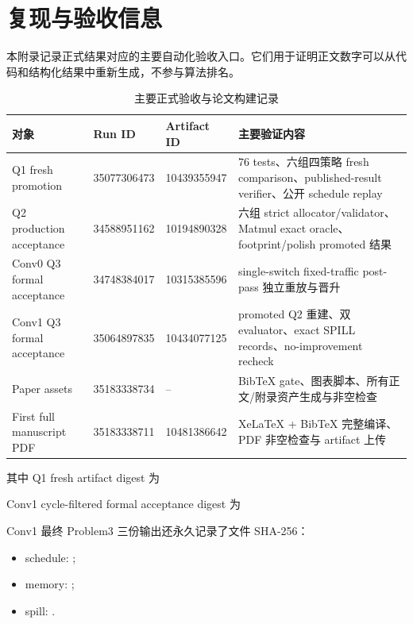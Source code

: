 \section{复现与验收信息}

本附录记录正式结果对应的主要自动化验收入口。它们用于证明正文数字可以从代码和结构化结果中重新生成，不参与算法排名。

\begin{table}[H]
\centering
\caption{主要正式验收与论文构建记录}
\label{tab:app-provenance}
\begin{tabular}{p{3.5cm}p{2.3cm}p{2.5cm}p{5.0cm}}
\toprule
对象 & Run ID & Artifact ID & 主要验证内容 \\
\midrule
Q1 fresh promotion & 35077306473 & 10439355947 & 76 tests、六组四策略 fresh comparison、published-result verifier、公开 schedule replay \\
Q2 production acceptance & 34588951162 & 10194890328 & 六组 strict allocator/validator、Matmul exact oracle、footprint/polish promoted 结果 \\
Conv0 Q3 formal acceptance & 34748384017 & 10315385596 & single-switch fixed-traffic post-pass 独立重放与晋升 \\
Conv1 Q3 formal acceptance & 35064897835 & 10434077125 & promoted Q2 重建、双 evaluator、exact SPILL records、no-improvement recheck \\
Paper assets & 35183338734 & -- & BibTeX gate、图表脚本、所有正文/附录资产生成与非空检查 \\
First full manuscript PDF & 35183338711 & 10481386642 & XeLaTeX + BibTeX 完整编译、PDF 非空检查与 artifact 上传 \\
\bottomrule
\end{tabular}
\end{table}

其中 Q1 fresh artifact digest 为
\begin{center}
\small\texttt{}
\end{center}
Conv1 cycle-filtered formal acceptance digest 为
\begin{center}
\small\texttt{}
\end{center}

Conv1 最终 Problem3 三份输出还永久记录了文件 SHA-256：
\begin{itemize}
    \item schedule: \texttt{};
    \item memory: \texttt{};
    \item spill: \texttt{}.
\end{itemize}

